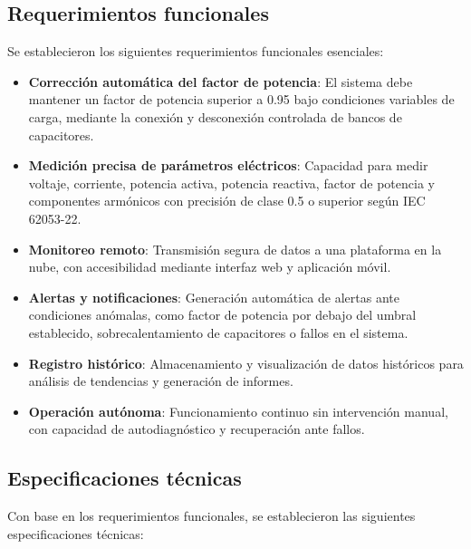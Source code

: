 \documentclass{report}          %
\begin{document}
            \subsection{Requerimientos funcionales}
                Se establecieron los siguientes requerimientos funcionales esenciales:
        
                \begin{itemize}
                    \item \textbf{Corrección automática del factor de potencia}: El sistema debe mantener un factor de potencia superior a 0.95 bajo condiciones variables de carga, mediante la conexión y desconexión controlada de bancos de capacitores.
                    
                    \item \textbf{Medición precisa de parámetros eléctricos}: Capacidad para medir voltaje, corriente, potencia activa, potencia reactiva, factor de potencia y componentes armónicos con precisión de clase 0.5 o superior según IEC 62053-22.
                    
                    \item \textbf{Monitoreo remoto}: Transmisión segura de datos a una plataforma en la nube, con accesibilidad mediante interfaz web y aplicación móvil.
                    
                    \item \textbf{Alertas y notificaciones}: Generación automática de alertas ante condiciones anómalas, como factor de potencia por debajo del umbral establecido, sobrecalentamiento de capacitores o fallos en el sistema.
                    
                    \item \textbf{Registro histórico}: Almacenamiento y visualización de datos históricos para análisis de tendencias y generación de informes.
                    
                    \item \textbf{Operación autónoma}: Funcionamiento continuo sin intervención manual, con capacidad de autodiagnóstico y recuperación ante fallos.
                \end{itemize}
            
            \subsection{Especificaciones técnicas}
                Con base en los requerimientos funcionales, se establecieron las siguientes especificaciones técnicas:
        
\end{document}
